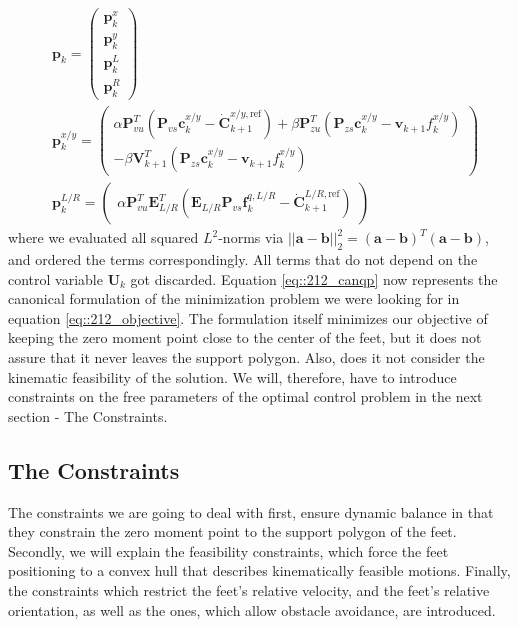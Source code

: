 \begin{align}
	&\bm{p}_k = \begin{pmatrix}
		\bm{p}_k^x \\
		\bm{p}_k^y \\
		\bm{p}_k^{L} \\
		\bm{p}_k^{R}
	\end{pmatrix} \\
	& \bm{p}_k^{x/y} = \begin{pmatrix}
		\alpha\bm{P}_{vu}^T(\bm{P}_{vs}\bm{c}_k^{x/y}-\dot{\bm{C}}_{k+1}^{x/y,\text{ref}}) + \beta\bm{P}_{zu}^T(\bm{P}_{zs}\bm{c}_k^{x/y}-\bm{v}_{k+1}f_k^{x/y})\\
		-\beta\bm{V}_{k+1}^T(\bm{P}_{zs}\bm{c}_k^{x/y}-\bm{v}_{k+1}f_k^{x/y})
	\end{pmatrix} \\
	& \bm{p}_k^{L/R} = \begin{pmatrix}
		\alpha\bm{P}_{vu}^T\bm{E}_{L/R}^T(\bm{E}_{L/R}\bm{P}_{vs}\bm{f}_k^{q,L/R}-\dot{\bm{C}}_{k+1}^{L/R,\text{ref}})
	\end{pmatrix}
\end{align}
where we evaluated all squared $L^2$-norms via $||\bm{a}-\bm{b}||^2_2 = (\bm{a}-\bm{b})^T(\bm{a}-\bm{b})$, and ordered the terms correspondingly. All terms that do not depend on the control variable $\bm{U}_k$ got discarded. Equation \ref{eq::212_canqp} now represents the canonical formulation of the minimization problem we were looking for in equation \ref{eq::212_objective}. The formulation itself minimizes our objective of keeping the zero moment point close to the center of the feet, but it does not assure that it never leaves the support polygon. Also, does it not consider the kinematic feasibility of the solution. We will, therefore, have to introduce constraints on the free parameters of the optimal control problem in the next section - The Constraints.
\FloatBarrier
\subsection{The Constraints}
The constraints we are going to deal with first, ensure dynamic balance in that they constrain the zero moment point to the support polygon of the feet. Secondly, we will explain the feasibility constraints, which force the feet positioning to a convex hull that describes kinematically feasible motions. Finally, the constraints which restrict the feet's relative velocity, and the feet's relative orientation, as well as the ones, which allow obstacle avoidance, are introduced.

